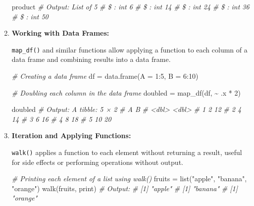 \documentclass[
]{article}
\newenvironment{Shaded}{}{}
\newcommand{\AttributeTok}[1]{\textcolor[rgb]{0.49,0.56,0.16}{#1}}
\newcommand{\CommentTok}[1]{\textcolor[rgb]{0.38,0.63,0.69}{\textit{#1}}}
\newcommand{\DecValTok}[1]{\textcolor[rgb]{0.25,0.63,0.44}{#1}}
\newcommand{\FunctionTok}[1]{\textcolor[rgb]{0.02,0.16,0.49}{#1}}
\newcommand{\NormalTok}[1]{#1}
\newcommand{\OtherTok}[1]{\textcolor[rgb]{0.00,0.44,0.13}{#1}}
\newcommand{\SpecialCharTok}[1]{\textcolor[rgb]{0.25,0.44,0.63}{#1}}
\newcommand{\StringTok}[1]{\textcolor[rgb]{0.25,0.44,0.63}{#1}}
\begin{document}
\begin{enumerate}
\begin{Shaded}
\begin{Highlighting}[]
\NormalTok{ product}
 \CommentTok{\# Output: List of 5}
 \CommentTok{\# \$ : int 6}
 \CommentTok{\# \$ : int 14}
 \CommentTok{\# \$ : int 24}
 \CommentTok{\# \$ : int 36}
 \CommentTok{\# \$ : int 50}
\end{Highlighting}
\end{Shaded}
\item
  \textbf{Working with Data Frames:}

  \texttt{map\_df()} and similar functions allow applying a function to
  each column of a data frame and combining results into a data frame.

\begin{Shaded}
\begin{Highlighting}[]
 \CommentTok{\# Creating a data frame}
\NormalTok{ df }\OtherTok{=} \FunctionTok{data.frame}\NormalTok{(}\AttributeTok{A =} \DecValTok{1}\SpecialCharTok{:}\DecValTok{5}\NormalTok{, }\AttributeTok{B =} \DecValTok{6}\SpecialCharTok{:}\DecValTok{10}\NormalTok{)}

 \CommentTok{\# Doubling each column in the data frame}
\NormalTok{ doubled }\OtherTok{=} \FunctionTok{map\_df}\NormalTok{(df, }\SpecialCharTok{\textasciitilde{}}\NormalTok{ .x }\SpecialCharTok{*} \DecValTok{2}\NormalTok{)}

\NormalTok{ doubled}
 \CommentTok{\# Output: A tibble: 5 × 2}
 \CommentTok{\#       A     B}
 \CommentTok{\#   \textless{}dbl\textgreater{} \textless{}dbl\textgreater{}}
 \CommentTok{\# 1     2    12}
 \CommentTok{\# 2     4    14}
 \CommentTok{\# 3     6    16}
 \CommentTok{\# 4     8    18}
 \CommentTok{\# 5    10    20}
\end{Highlighting}
\end{Shaded}
\item
  \textbf{Iteration and Applying Functions:}

  \texttt{walk()} applies a function to each element without returning a
  result, useful for side effects or performing operations without
  output.

\begin{Shaded}
\begin{Highlighting}[]
\CommentTok{\# Printing each element of a list using walk()}
\NormalTok{fruits }\OtherTok{=} \FunctionTok{list}\NormalTok{(}\StringTok{"apple"}\NormalTok{, }\StringTok{"banana"}\NormalTok{, }\StringTok{"orange"}\NormalTok{)}
\FunctionTok{walk}\NormalTok{(fruits, print)}
\CommentTok{\# Output:}
\CommentTok{\# [1] "apple"}
\CommentTok{\# [1] "banana"}
\CommentTok{\# [1] "orange"}
\end{Highlighting}
\end{Shaded}
\end{enumerate}
\end{document}

